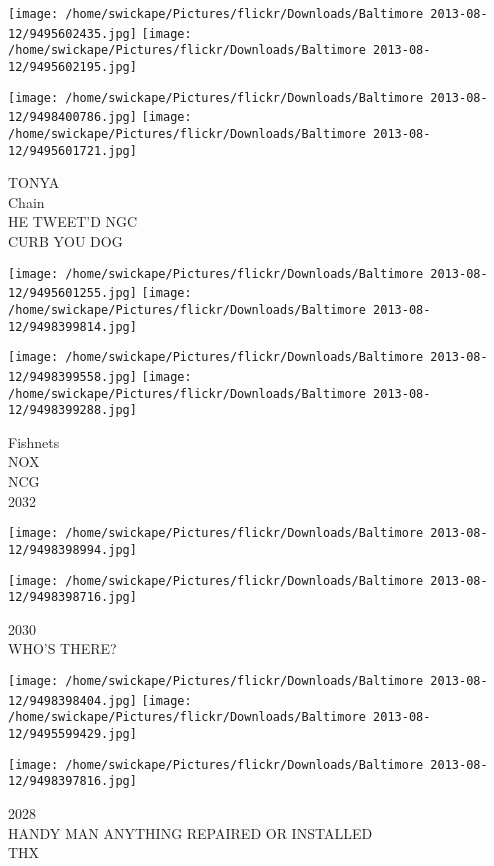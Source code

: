 \documentclass[10pt,letterpaper]{article}
\begin{document}
\texttt{[image: /home/swickape/Pictures/flickr/Downloads/Baltimore 2013-08-12/9495602435.jpg]}
\texttt{[image: /home/swickape/Pictures/flickr/Downloads/Baltimore 2013-08-12/9495602195.jpg]}

\texttt{[image: /home/swickape/Pictures/flickr/Downloads/Baltimore 2013-08-12/9498400786.jpg]}
\texttt{[image: /home/swickape/Pictures/flickr/Downloads/Baltimore 2013-08-12/9495601721.jpg]}

TONYA\\
Chain\\
HE TWEET'D NGC\\
CURB YOU DOG\\
\pagebreak

\texttt{[image: /home/swickape/Pictures/flickr/Downloads/Baltimore 2013-08-12/9495601255.jpg]}
\texttt{[image: /home/swickape/Pictures/flickr/Downloads/Baltimore 2013-08-12/9498399814.jpg]}

\texttt{[image: /home/swickape/Pictures/flickr/Downloads/Baltimore 2013-08-12/9498399558.jpg]}
\texttt{[image: /home/swickape/Pictures/flickr/Downloads/Baltimore 2013-08-12/9498399288.jpg]}

Fishnets\\
NOX\\
NCG\\
2032\\
\pagebreak

\texttt{[image: /home/swickape/Pictures/flickr/Downloads/Baltimore 2013-08-12/9498398994.jpg]}

\vspace{0.25in}
\texttt{[image: /home/swickape/Pictures/flickr/Downloads/Baltimore 2013-08-12/9498398716.jpg]}

2030\\
WHO'S THERE?\\
\pagebreak

\texttt{[image: /home/swickape/Pictures/flickr/Downloads/Baltimore 2013-08-12/9498398404.jpg]}
\texttt{[image: /home/swickape/Pictures/flickr/Downloads/Baltimore 2013-08-12/9495599429.jpg]}

\vspace{0.25in}
\texttt{[image: /home/swickape/Pictures/flickr/Downloads/Baltimore 2013-08-12/9498397816.jpg]}

2028\\
HANDY MAN ANYTHING REPAIRED OR INSTALLED\\
THX\\
\pagebreak
\end{document}
